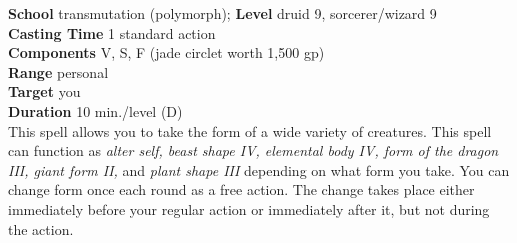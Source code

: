 \textbf{School }transmutation (polymorph); \textbf{Level }druid 9, sorcerer/wizard 9\\
\textbf{Casting Time }1 standard action\\
\textbf{Components }V, S, F (jade circlet worth 1,500 gp)\\
\textbf{Range }personal\\
\textbf{Target }you\\
\textbf{Duration }10 min./level (D)\\
This spell allows you to take the form of a wide variety of creatures. This spell can function as \textit{alter self, beast shape IV, elemental body IV, form of the dragon III, giant form II, }and \textit{plant shape III} depending on what form you take. You can change form once each round as a free action. The change takes place either immediately before your regular action or immediately after it, but not during the action. \\
